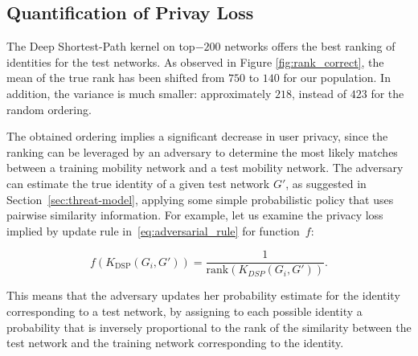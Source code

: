 \subsection{Quantification of Privay Loss}



The Deep Shortest-Path kernel on top$-200$ networks offers the best ranking of identities for the test networks.
As observed in Figure \ref{fig:rank_correct}, the mean of the true rank has been shifted from $ 750 $ to $ 140 $ for our population.
In addition, the variance is much smaller: approximately $ 218 $, instead of $ 423 $ for the random ordering.




The obtained ordering implies a significant decrease in user privacy, since the ranking can be leveraged by an adversary to determine the most likely matches between a training mobility network and a test mobility network.
The adversary can estimate the true identity of a given test network $ G' $, as suggested in Section~\ref{sec:threat-model}, applying some simple probabilistic policy that uses pairwise similarity information. For example, let us examine the privacy loss implied by update rule in~\eqref{eq:adversarial_rule} for  \mbox{function $ f$}:

\[
f\left(K_{\text{DSP}}(G_i, G')\right) =\frac{1}{\text{rank}\left(K_{DSP}(G_i, G')\right)}.
\label{eq:inverse_rank}
\]


This means that the adversary updates her probability estimate for the identity corresponding to a test network, by assigning to each possible identity a probability that is inversely proportional to the rank of the similarity between the test network and the training network corresponding to the identity.

